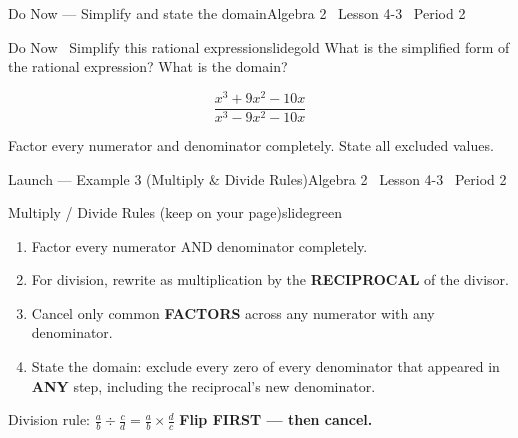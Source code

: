 \documentclass[aspectratio=169, 11pt]{beamer}
\begin{document}

\begin{frame}{Do Now --- Simplify and state the domain}{Algebra 2 \textperiodcentered\ Lesson 4-3 \textperiodcentered\ Period 2}
\vspace{0.2cm}
\begin{projcard}{Do Now \textperiodcentered\ Simplify this rational expression}{slidegold}
What is the simplified form of the rational expression? What is the domain?

\vspace{0.25cm}
\[
\frac{x^3+9x^2-10x}{x^3-9x^2-10x}
\]

\vspace{0.1cm}
\small Factor every numerator and denominator completely. State all excluded values.
\end{projcard}
\end{frame}

\begin{frame}{Launch --- Example 3 (Multiply \& Divide Rules)}{Algebra 2 \textperiodcentered\ Lesson 4-3 \textperiodcentered\ Period 2}
\vspace{0.2cm}
\begin{projcard}{Multiply / Divide Rules (keep on your page)}{slidegreen}
\begin{enumerate}
  \setlength{\itemsep}{1pt}
  \item Factor every numerator AND denominator completely.
  \item For division, rewrite as multiplication by the \textbf{RECIPROCAL} of the divisor.
  \item Cancel only common \textbf{FACTORS} across any numerator with any denominator.
  \item State the domain: exclude every zero of every denominator that appeared in \textbf{ANY} step, including the reciprocal's new denominator.
\end{enumerate}

\vspace{0.1cm}
\small
Division rule: \(\displaystyle\frac{a}{b}\div\frac{c}{d}=\frac{a}{b}\times\frac{d}{c}\)
\hspace{1em}
\textcolor{slideaccent}{\textbf{Flip FIRST --- then cancel.}}
\end{projcard}
\end{frame}
\end{document}
